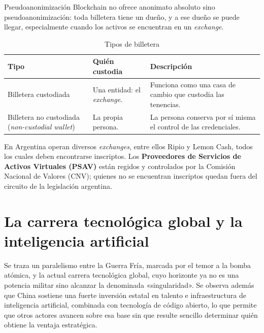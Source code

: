 \documentclass[12pt,oneside]{book}
\begin{document}
\begin{definition}{Pseudoanonimización}
Blockchain no ofrece anonimato absoluto sino pseudoanonimización: toda billetera tiene un dueño, y a ese dueño se puede llegar, especialmente cuando los activos se encuentran en un \emph{exchange}.
\end{definition}

\begin{table}[H]
\centering
\caption{Tipos de billetera}
\renewcommand{\arraystretch}{1.2}
\begin{tabularx}{\textwidth}{>{\raggedright\arraybackslash}p{}>{\raggedright\arraybackslash}p{}X}
\toprule
\textbf{Tipo} & \textbf{Quién custodia} & \textbf{Descripción} \\
\midrule
Billetera custodiada & Una entidad: el \emph{exchange}. & Funciona como una casa de cambio que custodia las tenencias. \\
Billetera no custodiada (\emph{non-custodial wallet}) & La propia persona. & La persona conserva por sí misma el control de las credenciales. \\
\bottomrule
\end{tabularx}
\end{table}

En Argentina operan diversos \emph{exchanges}, entre ellos Ripio y Lemon Cash, todos los cuales deben encontrarse inscriptos. Los \textbf{Proveedores de Servicios de Activos Virtuales (PSAV)} están regidos y controlados por la Comisión Nacional de Valores (CNV); quienes no se encuentran inscriptos quedan fuera del circuito de la legislación argentina.

\section{La carrera tecnológica global y la inteligencia artificial}

Se traza un paralelismo entre la Guerra Fría, marcada por el temor a la bomba atómica, y la actual carrera tecnológica global, cuyo horizonte ya no es una potencia militar sino alcanzar la denominada «singularidad». Se observa además que China sostiene una fuerte inversión estatal en talento e infraestructura de inteligencia artificial, combinada con tecnología de código abierto, lo que permite que otros actores avancen sobre esa base sin que resulte sencillo determinar quién obtiene la ventaja estratégica.
\end{document}
